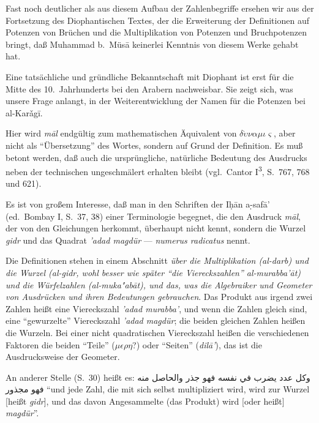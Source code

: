 \documentclass[11pt,a4paper]{article}
\newcommand{\RL}[1]{\beginR#1\endR}
\newcommand{\s}[1]{\d{#1}}     %
\newcommand{\hw}{\d{h}}       %
\newcommand{\ar}[1]{{\arabicfont\RL{#1}}}
\newcommand{\enquote}[1]{``#1''}
\begin{document}
Fast noch deutlicher als aus diesem Aufbau der Zahlenbegriffe ersehen wir aus der Fortsetzung des Diophantischen Textes, der die Erweiterung der Definitionen auf Potenzen von Br\"uchen und die Multiplikation von Potenzen und Bruchpotenzen bringt, da\ss{} Muhammad b.\ M\"us\=a keinerlei Kenntnis von diesem Werke gehabt hat.

Eine tats\"achliche und gr\"undliche Bekanntschaft mit Diophant ist erst f\"ur die Mitte des 10.\ Jahrhunderts bei den Arabern nachweisbar. Sie zeigt sich, was unsere Frage anlangt, in der Weiterentwicklung der Namen f\"ur die Potenzen bei al-Kar\v{a}g\=i{}.

Hier wird \textit{m\=al} endg\"ultig zum mathematischen \"Aquivalent von $\delta\dot{\upsilon}\nu\alpha\mu\iota\varsigma$, aber nicht als \enquote{\"Ubersetzung} des Wortes, sondern auf Grund der Definition. Es mu\ss{} betont werden, da\ss{} auch die urspr\"ungliche, nat\"urliche Bedeutung des Ausdrucks neben der technischen ungeschm\"alert erhalten bleibt (vgl.\ Cantor I\textsuperscript{3}, S.\ 767, 768 und 621).

Es ist von gro\ss{}em Interesse, da\ss{} man in den Schriften der I\hw{}\=an a\s-s{}af\=a' (ed.\ Bombay I, S.\ 37, 38) einer Terminologie begegnet, die den Ausdruck \textit{m\=al}, der von den Gleichungen herkommt, \"uberhaupt nicht kennt, sondern die Wurzel \textit{gidr} und das Quadrat \textit{'adad ma\d{g}d\"ur} --- \textit{numerus radicatus} nennt.

Die Definitionen stehen in einem Abschnitt \textit{\"uber die Multiplikation (al-darb) und die Wurzel (al-gidr, wohl besser wie sp\"ater \enquote{die Viereckszahlen} al-murabba'\=at) und die W\"urfelzahlen (al-muka"ab\=at), und das, was die Algebraiker und Geometer von Ausdr\"ucken und ihren Bedeutungen gebrauchen}. Das Produkt aus irgend zwei Zahlen hei\ss{}t eine Viereckszahl \textit{'adad murabba'}, und wenn die Zahlen gleich sind, eine \enquote{gewurzelte} Viereckszahl \textit{'adad ma\d{g}d\"ur}; die beiden gleichen Zahlen hei\ss{}en die Wurzeln. Bei einer nicht quadratischen Viereckszahl hei\ss{}en die verschiedenen Faktoren die beiden \enquote{Teile} ($\mu\epsilon\rho\eta$?) oder \enquote{Seiten} (\textit{dil\=a'}), das ist die Ausdrucksweise der Geometer.

An anderer Stelle (S.\ 30) hei\ss{}t es: \ar{وكل عدد يضرب في نفسه فهو جذر والحاصل منه فهو مجذور} \enquote{und jede Zahl, die mit sich selbst multipliziert wird, wird zur Wurzel [hei\ss{}t \textit{gidr}], und das davon Angesammelte (das Produkt) wird [oder hei\ss{}t] \textit{ma\d{g}d\"ur}}.
\end{document}
